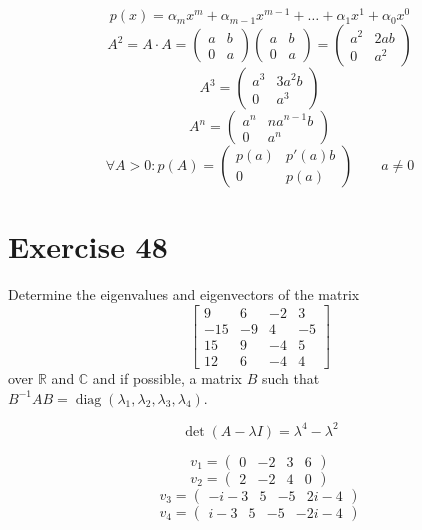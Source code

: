 \documentclass[a4paper]{article}
\theoremstyle{definition}
\begin{document}
\[ p(x) = \alpha_m x^m + \alpha_{m-1} x^{m-1} + \dots + \alpha_1 x^1 + \alpha_0 x^0 \]
\[ A^2 = A \cdot A = \begin{pmatrix} a & b \\ 0 & a \end{pmatrix} \begin{pmatrix} a & b \\ 0 & a \end{pmatrix} = \begin{pmatrix} a^2 & 2ab \\ 0 & a^2 \end{pmatrix} \]
\[ A^3 = \begin{pmatrix} a^3 & 3a^2 b \\ 0 & a^3 \end{pmatrix} \]
\[ A^n = \begin{pmatrix} a^n & na^{n-1} b \\ 0 & a^n \end{pmatrix} \]
\[
  \forall A > 0:
  p(A) = \begin{pmatrix}
    p(a) & p'(a) b \\
    0 & p(a)
  \end{pmatrix} \qquad a \neq 0
\]

\section{Exercise 48}
\begin{ex}
  Determine the eigenvalues and eigenvectors of the matrix
  \[
    \begin{bmatrix}
      9 & 6 & -2 & 3 \\
      -15 & -9 & 4 & -5 \\
      15 & 9 & -4 & 5 \\
      12 & 6 & -4 & 4
    \end{bmatrix}
  \]
  over $\mathbb R$ and $\mathbb C$ and if possible, a matrix $B$ such that $B^{-1} AB = \operatorname{diag}(\lambda_1, \lambda_2, \lambda_3, \lambda_4)$.
\end{ex}

\[ \det(A - \lambda I) = \lambda^4 - \lambda^2 \]

\[ v_1 = \begin{pmatrix} 0 & -2 & 3 & 6 \end{pmatrix} \]
\[ v_2 = \begin{pmatrix} 2 & -2 & 4 & 0 \end{pmatrix} \]
\[ v_3 = \begin{pmatrix} -i-3 & 5 & -5 & 2i-4 \end{pmatrix} \]
\[ v_4 = \begin{pmatrix} i-3 & 5 & -5 & -2i-4 \end{pmatrix} \]
\end{document}
